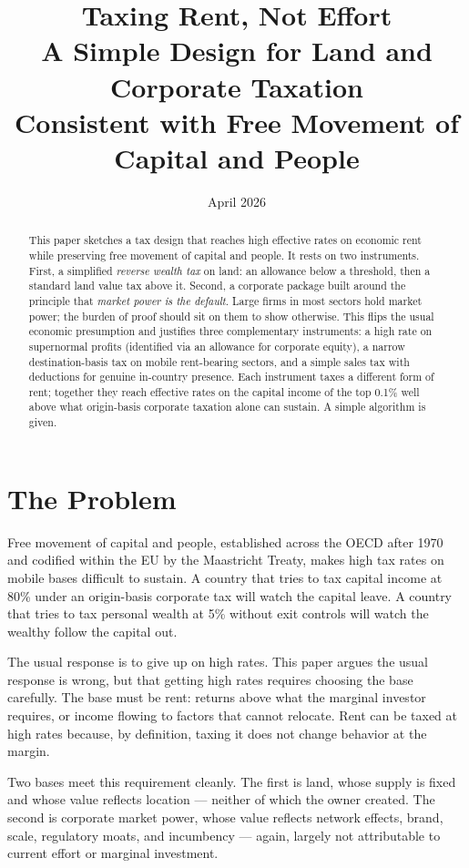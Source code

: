 \documentclass[11pt,a4paper]{article}
\title{\textbf{Taxing Rent, Not Effort} \\[0.4em]
\large A Simple Design for Land and Corporate Taxation \\ Consistent with Free Movement of Capital and People}
\author{}
\date{April 2026}
\begin{document}
\maketitle

\begin{abstract}
\noindent This paper sketches a tax design that reaches high effective rates on economic rent while preserving free movement of capital and people. It rests on two instruments. First, a simplified \emph{reverse wealth tax} on land: an allowance below a threshold, then a standard land value tax above it. Second, a corporate package built around the principle that \emph{market power is the default}. Large firms in most sectors hold market power; the burden of proof should sit on them to show otherwise. This flips the usual economic presumption and justifies three complementary instruments: a high rate on supernormal profits (identified via an allowance for corporate equity), a narrow destination-basis tax on mobile rent-bearing sectors, and a simple sales tax with deductions for genuine in-country presence. Each instrument taxes a different form of rent; together they reach effective rates on the capital income of the top 0.1\% well above what origin-basis corporate taxation alone can sustain. A simple algorithm is given.
\end{abstract}

\section{The Problem}

Free movement of capital and people, established across the OECD after 1970 and codified within the EU by the Maastricht Treaty, makes high tax rates on mobile bases difficult to sustain. A country that tries to tax capital income at 80\% under an origin-basis corporate tax will watch the capital leave. A country that tries to tax personal wealth at 5\% without exit controls will watch the wealthy follow the capital out.

The usual response is to give up on high rates. This paper argues the usual response is wrong, but that getting high rates requires choosing the base carefully. The base must be rent: returns above what the marginal investor requires, or income flowing to factors that cannot relocate. Rent can be taxed at high rates because, by definition, taxing it does not change behavior at the margin.

Two bases meet this requirement cleanly. The first is land, whose supply is fixed and whose value reflects location — neither of which the owner created. The second is corporate market power, whose value reflects network effects, brand, scale, regulatory moats, and incumbency — again, largely not attributable to current effort or marginal investment.
\end{document}
